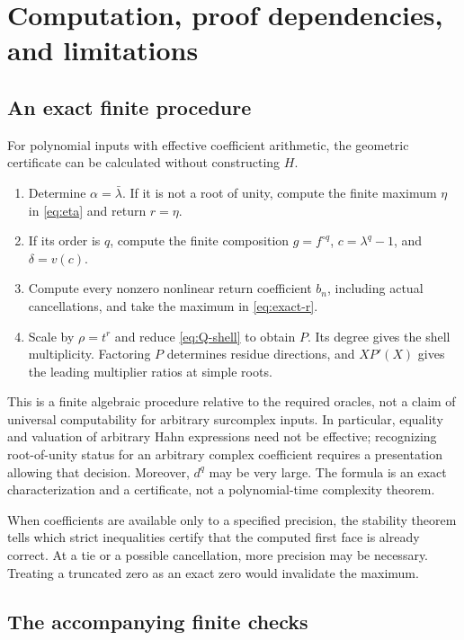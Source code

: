 \documentclass[11pt,letterpaper]{article}
\numberwithin{equation}{section}
\theoremstyle{plain}
\theoremstyle{definition}
\theoremstyle{remark}
\begin{document}
\section{Computation, proof dependencies, and limitations}\label{sec:verification}

\subsection{An exact finite procedure}

For polynomial inputs with effective coefficient arithmetic, the geometric
certificate can be calculated without constructing $H$.
\begin{enumerate}[label=\arabic*.]
\item Determine $\alpha=\bar\lambda$. If it is not a root of unity,
compute the finite maximum $\eta$ in \eqref{eq:eta} and return $r=\eta$.
\item If its order is $q$, compute the finite composition $g=f^{\circ q}$,
$c=\lambda^q-1$, and $\delta=v(c)$.
\item Compute every nonzero nonlinear return coefficient $b_n$, including
actual cancellations, and take the maximum in \eqref{eq:exact-r}.
\item Scale by $\rho=t^r$ and reduce \eqref{eq:Q-shell} to obtain $P$.
Its degree gives the shell multiplicity. Factoring $P$ determines residue
directions, and $XP'(X)$ gives the leading multiplier ratios at simple roots.
\end{enumerate}
This is a finite algebraic procedure relative to the required oracles, not a
claim of universal computability for arbitrary surcomplex inputs. In
particular, equality and valuation of arbitrary Hahn expressions need not be
effective; recognizing root-of-unity status for an arbitrary complex
coefficient requires a presentation allowing that decision. Moreover,
$d^q$ may be very large. The formula is an exact characterization and a
certificate, not a polynomial-time complexity theorem.

When coefficients are available only to a specified precision, the stability
theorem tells which strict inequalities certify that the computed first face
is already correct. At a tie or a possible cancellation, more precision may
be necessary. Treating a truncated zero as an exact zero would invalidate the
maximum.

\subsection{The accompanying finite checks}
\end{document}
